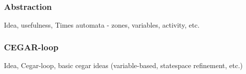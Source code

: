 \subsubsection{Abstraction}
Idea, usefulness, Times automata - zones, variables, activity, etc.
\subsubsection{CEGAR-loop}
Idea, Cegar-loop, basic cegar ideas (variable-based, statespace refinement, etc.)



